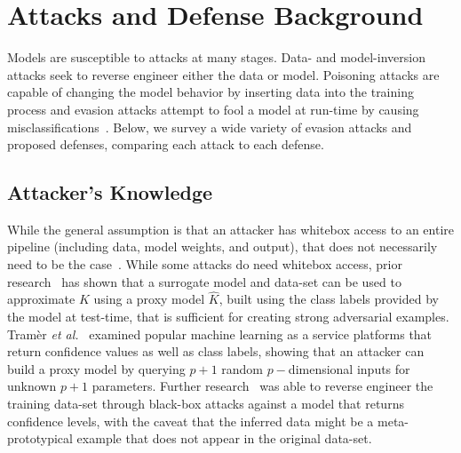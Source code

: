 \documentclass[lettersize,journal]{IEEEtran}
\newcommand{\cm}[1]{\textit{[{\color{blue}#1}]}}
\begin{document}



\section{Attacks and Defense Background}

Models are susceptible to attacks at many stages. Data- and model-inversion attacks seek to reverse engineer either the data or model. Poisoning attacks are capable of changing the model behavior by inserting data into the training process and evasion attacks attempt to fool a model at run-time by causing misclassifications~\cite{biggio_evasion_2013}. Below, we survey a wide variety of evasion attacks and proposed defenses, comparing each attack to each defense.

\subsection{Attacker's Knowledge}
 While the general assumption is that an attacker has whitebox access to an entire pipeline (including data, model weights, and output), that does not necessarily need to be the case~\cite{hopskipjump, chakraborty_adversarial_2018}. While some attacks do need whitebox access, prior research~\cite{hopskipjump, nelson2010behavior} has shown that a surrogate model and data-set can be used to approximate $K$ using a proxy model $\widehat{K}$, built using the class labels provided by the model at test-time, that is sufficient for creating strong adversarial examples. Tram\`er \textit{et al.}~\cite{tramer2016stealing} examined popular machine learning as a service platforms that return confidence values as well as class labels, showing that an attacker can build a proxy model by querying $ p + 1$ random $p-$dimensional inputs for unknown $p+1$ parameters. Further research~\cite{fredrikson_model_2015} was able to reverse engineer the training data-set through black-box attacks against a model that returns confidence levels, with the caveat that the inferred data might be a meta-prototypical example that does not appear in the original data-set. 
\end{document}
